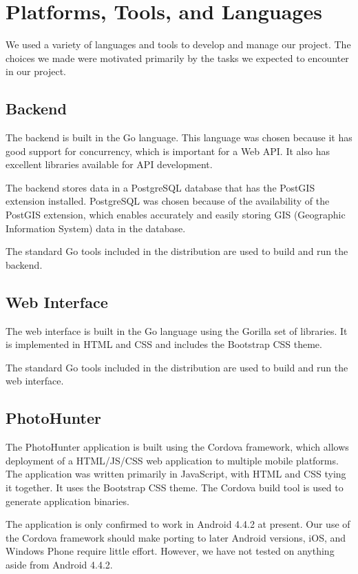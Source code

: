 \documentclass{article}
\begin{document}
\section{Platforms, Tools, and Languages}

We used a variety of languages and tools to develop and manage our project. The
choices we made were motivated primarily by the tasks we expected to encounter
in our project.

\subsection{Backend}

The backend is built in the Go language. This language was chosen because it
has good support for concurrency, which is important for a Web API. It also has
excellent libraries available for API development.

The backend stores data in a PostgreSQL database that has the PostGIS extension
installed. PostgreSQL was chosen because of the availability of the PostGIS
extension, which enables accurately and easily storing GIS (Geographic
Information System) data in the database.

The standard Go tools included in the distribution are used to build and run
the backend.

\subsection{Web Interface}

The web interface is built in the Go language using the Gorilla set of
libraries. It is implemented in HTML and CSS and includes the
Bootstrap CSS theme.

The standard Go tools included in the distribution are used to build and run
the web interface.

\subsection{PhotoHunter}

The PhotoHunter application is built using the Cordova framework,
which allows deployment of a HTML/JS/CSS web application to multiple mobile
platforms. The application was written primarily in JavaScript, with HTML and
CSS tying it together. It uses the Bootstrap CSS theme. The Cordova build tool
is used to generate application binaries.

The application is only confirmed to work in Android 4.4.2 at present. Our use
of the Cordova framework should make porting to later Android versions, iOS,
and Windows Phone require little effort. However, we have not tested on
anything aside from Android 4.4.2.
\end{document}
